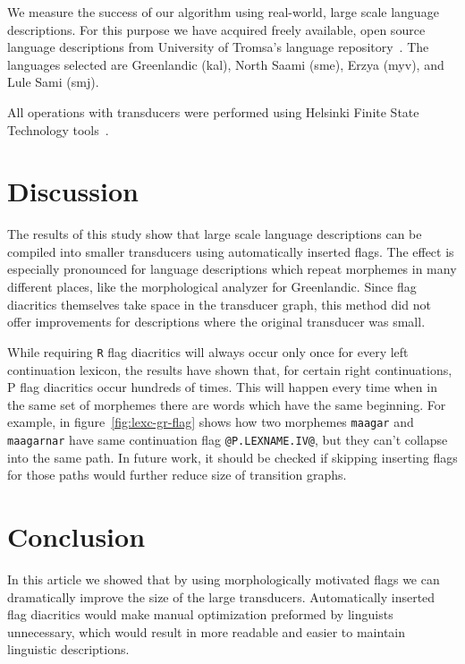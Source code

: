 \documentclass[11pt]{article}
\begin{document}
We measure the success of our algorithm using real-world, large scale
language descriptions. For this purpose we have acquired freely
available, open source language descriptions from University of
Tromsa's language repository~\cite{moshagen2013building}. The
languages selected are Greenlandic (kal), North Saami (sme), Erzya
(myv), and Lule Sami (smj).

All operations with transducers were performed using Helsinki Finite
State Technology tools~\cite{linden2011}.



\section{Discussion}
\label{sec:discussion}

The results of this study show that large scale language descriptions
can be compiled into smaller transducers using automatically inserted
flags. The effect is especially pronounced for language descriptions
which repeat morphemes in many different places, like the
morphological analyzer for Greenlandic. Since flag diacritics
themselves take space in the transducer graph, this method did not
offer improvements for descriptions where the original
transducer was small.

While requiring {\tt R} flag diacritics will always occur only once
for every left continuation lexicon, the results have shown that, for
certain right continuations, P flag diacritics occur hundreds of
times. This will happen every time when in the same set of morphemes
there are words which have the same beginning. For example, in
figure~\ref{fig:lexc-gr-flag} shows how two morphemes \texttt{maagar}
and \texttt{maagarnar} have same continuation flag
\verb+@P.LEXNAME.IV@+, but they can't collapse into the same path. In future
work, it should be checked if skipping inserting flags for those paths would
further reduce size of transition graphs.




\section{Conclusion}
\label{sec:conclusion}

In this article we showed that by using morphologically motivated
flags we can dramatically improve the size of the large transducers.  Automatically
inserted flag diacritics would make manual optimization preformed by
linguists unnecessary, which would result in more readable and easier
to maintain linguistic descriptions.



\end{document}
